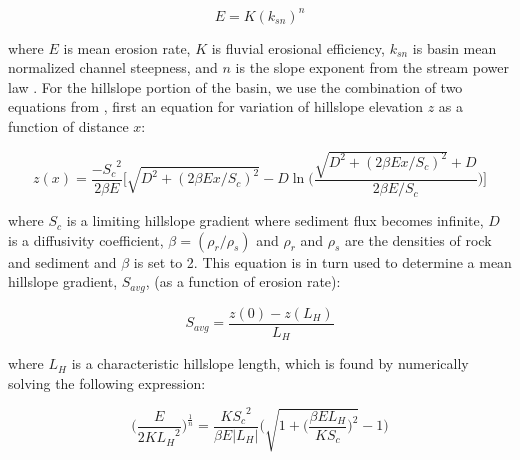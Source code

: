 \begin{equation}
E=K(k_{sn})^{n}
\end{equation}

\noindent
where $E$ is mean erosion rate, $K$ is fluvial erosional efficiency, $k_{sn}$ is basin mean normalized channel steepness, and $n$ is the slope exponent from the stream power law \citep[e.g.,][]{Snyder2003,Ouimet2009}. For the hillslope portion of the basin, we use the combination of two equations from \cite{Roering2007}, first an equation for variation of hillslope elevation $z$ as a function of distance $x$:

\begin{equation}
z(x) = \frac{-{S_{c}}^{2}}{2\beta E}  \bigg[ \sqrt{D^{2} + (2\beta Ex / S_{c})^{2}} -D\ln\bigg( \frac{ \sqrt{D^{2} + (2\beta Ex / S_{c})^{2}} + D}{2\beta E/S_{c}} \bigg)   \bigg]
\end{equation}

\noindent
where $S_{c}$ is a limiting hillslope gradient where sediment flux becomes infinite, $D$ is a diffusivity coefficient, $\beta = (\rho_{r}/\rho_{s})$ and $\rho_{r}$ and $\rho_{s}$ are the densities of rock and sediment and $\beta$ is set to 2. This equation is in turn used to determine a mean hillslope gradient, $S_{avg}$, (as a function of erosion rate):

\begin{equation}
S_{avg}=\frac{z(0)-z(L_{H})}{L_{H}}
\end{equation}

\noindent where $L_{H}$ is a characteristic hillslope length, which is found by numerically solving the following expression:

\begin{equation}
\bigg(  \frac{E}{2K{L_{H}}^{2}}  \bigg)^{\frac{1}{n}} = \frac{K{S_{c}}^{2}}{\beta E |L_{H}|} \Bigg( \sqrt{1 + \bigg( \frac{\beta E L_{H}}{KS_{c}} \bigg)^{2} } - 1 \Bigg)
\end{equation}

